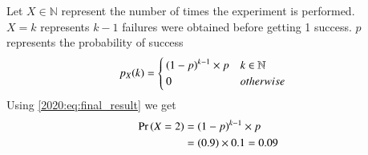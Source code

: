 Let $X\in\mathbb{N}$ represent the number of times the experiment is performed. \\
$X=k$ represents $k-1$ failures were obtained before getting 1 success. $p$ represents the probability of success
\begin{align}
	p_X(k) &=
\begin{cases}
\brak{1-p}^{k-1}\times p & k\in \mathbb{N}\\
0 &  otherwise 
\end{cases}
\label{2020:eq:final_result}
\end{align}
Using \eqref{2020:eq:final_result} we get
\begin{align}
\Pr\left(X=2\right)&=\left(1-p\right)^{k-1}\times p\nonumber\\
&=\left(0.9\right)\times 0.1=0.09
\end{align}
